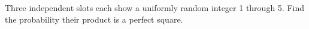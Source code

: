 Three independent slots each show a uniformly random integer 1 through 5. Find the probability their product is a perfect square.

